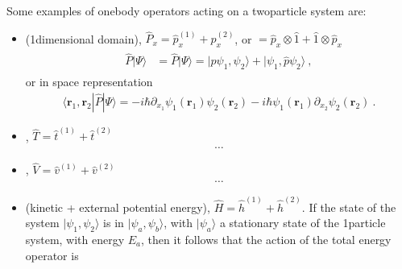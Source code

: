 \documentclass[letterpaper,10pt,english]{jupyterBook}
\begin{document}
\sphinxAtStartPar
Some examples of one\sphinxhyphen{}body operators acting on a two\sphinxhyphen{}particle system are:
\begin{itemize}
\item {} 
\sphinxAtStartPar
{} (1\sphinxhyphen{}dimensional domain), \(\hat{P}_x = \hat{p}_x^{(1)} + \hat{p}_x^{(2)}\), or \( = \hat{p}_x \otimes \hat{1} + \hat{1} \otimes \hat{p}_x\)
\begin{equation*}
\begin{split}\begin{aligned}
    \hat{P} | \Psi \rangle
    & = \hat{P} | \Psi \rangle     
      = | \hat{p} \psi_1, \psi_2 \rangle + | \psi_1, \hat{p}\psi_2 \rangle \ ,
  \end{aligned}\end{split}
\end{equation*}
\sphinxAtStartPar
or in space representation
\begin{equation*}
\begin{split}\langle \mathbf{r}_1, \mathbf{r}_2 | \hat{P} | \Psi \rangle = -i \hbar \partial_{x_1} \psi_1(\mathbf{r}_1) \psi_2(\mathbf{r}_2) - i \hbar \psi_1(\mathbf{r}_1) \partial_{x_2} \psi_2(\mathbf{r}_2) \ .\end{split}
\end{equation*}
\item {} 
\sphinxAtStartPar
{}, \(\hat{T} = \hat{t}^{(1)} + \hat{t}^{(2)}\)
\begin{equation*}
\begin{split}\dots\end{split}
\end{equation*}
\item {} 
\sphinxAtStartPar
{}, \(\hat{V} = \hat{v}^{(1)} + \hat{v}^{(2)}\)
\begin{equation*}
\begin{split}\dots\end{split}
\end{equation*}
\item {} 
\sphinxAtStartPar
{} (kinetic + external potential energy), \(\hat{H} = \hat{h}^{(1)} + \hat{h}^{(2)}\).
If the state of the system \(| \psi_1, \psi_2 \rangle\) is in \(| \psi_a, \psi_b \rangle\), with \(| \psi_a \rangle\) a stationary state of the 1\sphinxhyphen{}particle system, with energy \(E_a\), then it follows that the action of the total energy operator is
\begin{equation*}

\end{equation*}
\end{itemize}
\end{document}
